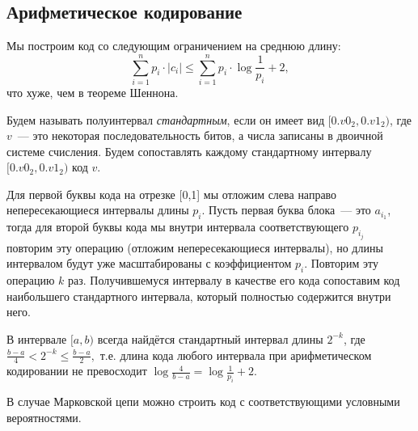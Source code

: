 \documentclass[12pt]{article}
\begin{document}
\subsection{Арифметическое кодирование}
Мы построим код со следующим ограничением на среднюю длину:
\[
    \sum_{i=1}^n p_i\cdot|c_i|\le \sum_{i=1}^n p_i\cdot \log\frac1{p_i} + 2, 
\]
что хуже, чем в теореме Шеннона.

\begin{definition}
    Будем называть полуинтервал \emph{стандартным}, если он имеет вид
    $[0.v0_2, 0.v1_2)$, где $v$~--- это некоторая последовательность битов,
    а числа записаны в двоичной системе счисления. Будем сопоставлять каждому
    стандартному интервалу $[0.v0_2, 0.v1_2)$ код $v$.

    Для первой буквы кода на отрезке [0,1] мы отложим слева направо непересекающиеся интервалы длины
    $p_i$. Пусть первая буква блока~--- это $a_{i_1}$, тогда для второй буквы кода мы внутри интервала
    соответствующего $p_{i_j}$ повторим эту операцию (отложим непересекающиеся интервалы), но длины интервалом 
    будут уже масштабированы с коэффициентом
    $p_i$. Повторим эту операцию $k$ раз. Получившемуся интервалу в качестве его кода 
    сопоставим код наибольшего стандартного интервала, который полностью содержится внутри него.
\end{definition}
\begin{statement}
    В интервале $[a,b)$ всегда найдётся стандартный интервал длины $2^{-k}$, где
    \(
    \frac{b-a}{4}<2^{-k}\le \frac{b-a}{2},
    \)
    т.е. длина кода любого интервала при арифметическом кодировании не
    превосходит $\log \frac{4}{b-a} = \log \frac{1}{p_i} + 2$.
\end{statement}

\begin{remark}
    В случае Марковской цепи можно строить код с соответствующими условными
    вероятностями.
\end{remark}
\end{document}
